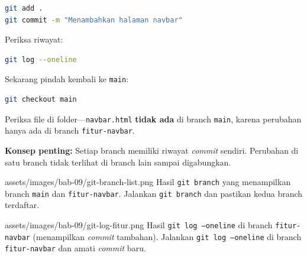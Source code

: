\begin{lstlisting}[language=bash, caption={Commit di branch fitur}, label={lst:git-commit-branch}]
git add .
git commit -m "Menambahkan halaman navbar"
\end{lstlisting}

\begin{langkah}
  \item Periksa riwayat:
\end{langkah}

\begin{lstlisting}[language=bash, caption={Riwayat commit di branch fitur}, label={lst:git-log-branch}]
git log --oneline
\end{lstlisting}

\begin{langkah}
  \item Sekarang pindah kembali ke \texttt{main}:
\end{langkah}

\begin{lstlisting}[language=bash, caption={Kembali ke branch main}, label={lst:git-checkout-main}]
git checkout main
\end{lstlisting}

\begin{langkah}
  \item Periksa file di folder---\texttt{navbar.html} \textbf{tidak ada} di branch \texttt{main}, karena perubahan hanya ada di branch \texttt{fitur-navbar}.
\end{langkah}

\begin{catatan}
\textbf{Konsep penting:} Setiap branch memiliki riwayat \emph{commit} sendiri. Perubahan di satu branch tidak terlihat di branch lain sampai digabungkan.
\end{catatan}

\begin{tangkapanlayar}
  {assets/images/bab-09/git-branch-list.png}
  {Hasil \texttt{git branch} yang menampilkan branch \texttt{main} dan \texttt{fitur-navbar}.}
  {Jalankan \texttt{git branch} dan pastikan kedua branch terdaftar.}
\end{tangkapanlayar}

\begin{tangkapanlayar}
  {assets/images/bab-09/git-log-fitur.png}
  {Hasil \texttt{git log --oneline} di branch \texttt{fitur-navbar} (menampilkan \emph{commit} tambahan).}
  {Jalankan \texttt{git log --oneline} di branch \texttt{fitur-navbar} dan amati \emph{commit} baru.}
\end{tangkapanlayar}

